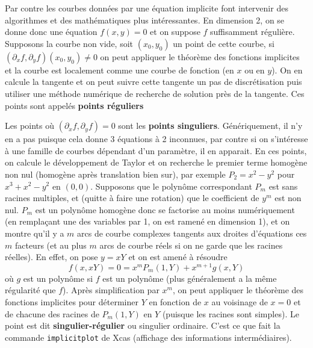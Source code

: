 \documentclass[a4paper,11pt]{article}
\begin{document}
\begin{giacjshere}
Par contre les courbes donn\'ees par une \'equation implicite
font intervenir des algorithmes et des math\'ematiques
plus int\'eressantes. En dimension 2, on se donne donc
une \'equation $f(x,y)=0$ et on suppose $f$ suffisamment
r\'eguli\`ere. Supposons la courbe non vide, soit $(x_0,y_0)$
un point de cette courbe, si $(\partial_x f,\partial_y f)(x_0,y_0) \neq
0$ on peut appliquer le th\'eor\`eme des fonctions implicites
et la courbe est localement comme une courbe de fonction (en $x$ ou
en $y$). On en calcule la tangente et on peut suivre cette tangente
un pas de discr\'etisation puis utiliser une m\'ethode num\'erique
de recherche de solution pr\`es de la tangente. Ces points
sont appel\'es {\bf points r\'eguliers}

Les points o\`u $(\partial_x f,\partial_y f)=0$ sont
les {\bf points singuliers}. 
G\'en\'eriquement, il n'y en a pas puisque
cela donne 3 \'equations \`a 2 inconnues, par contre si on
s'int\'eresse \`a une famille de courbes d\'ependant d'un
param\`etre, il en apparait. En ces points, on calcule le
d\'eveloppement de Taylor et on recherche le premier
terme homog\`ene non nul (homog\`ene apr\`es translation bien sur), 
par exemple
$P_2=x^2-y^2$ pour $x^3+x^2-y^2$ en $(0,0)$. 
Supposons que le polyn\^ome
correspondant $P_m$ est sans racines multiples, et (quitte
\`a faire une rotation) que le coefficient de $y^m$ est non nul.
$P_m$ est un polyn\^ome homog\`ene 
donc se factorise au moins num\'eriquement
(en rempla\c{c}ant une des variables par 1, on est ramen\'e en dimension 1),
et on montre qu'il y a $m$ arcs de courbe complexes tangents
aux droites d'\'equations ces $m$ facteurs (et au plus
$m$ arcs de courbe r\'eels si on ne garde
que les racines r\'eelles). En effet, on pose $y=xY$ et on 
est amen\'e \`a r\'esoudre
$$ f(x,xY)=0=x^mP_m(1,Y) + x^{m+1} g(x,Y)$$
o\`u $g$ est un polyn\^ome si $f$ est un polyn\^ome 
(plus g\'en\'eralement a la m\^eme r\'egularit\'e que $f$). 
Apr\`es simplification par $x^m$, on peut appliquer le th\'eor\`eme des
fonctions implicites pour d\'eterminer $Y$ en fonction de $x$ au
voisinage de $x=0$ et de chacune des racines de $P_m(1,Y)$ en $Y$
(puisque les racines sont simples).
Le point 
est dit {\bf singulier-r\'egulier} ou
singulier ordinaire. 
C'est ce que fait la commande \verb|implicitplot| de Xcas
(affichage des informations interm\'ediaires).


\end{giacjshere}
\end{document}
